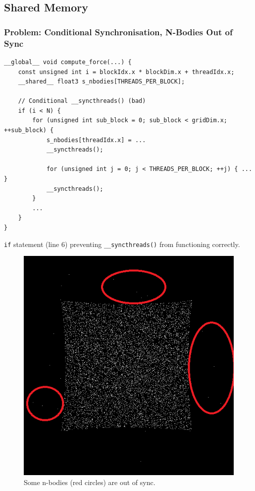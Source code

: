 \documentclass[12pt, a4paper]{article}
\begin{document}
\subsection{Shared Memory}
\subsubsection{Problem: Conditional Synchronisation, N-Bodies Out of Sync}
\begin{listing}[H]
  \begin{verbatim}
__global__ void compute_force(...) {
    const unsigned int i = blockIdx.x * blockDim.x + threadIdx.x;
    __shared__ float3 s_nbodies[THREADS_PER_BLOCK];

    // Conditional __syncthreads() (bad)
    if (i < N) {
        for (unsigned int sub_block = 0; sub_block < gridDim.x; ++sub_block) {
            s_nbodies[threadIdx.x] = ...
            __syncthreads();

            for (unsigned int j = 0; j < THREADS_PER_BLOCK; ++j) { ... }
            __syncthreads();
        }
        ...
    }
}
  \end{verbatim}
  \caption{\texttt{if} statement (line 6) preventing \texttt{\_\_syncthreads()} from functioning correctly.}
  \label{listing:shared_mem_difficulty}
\end{listing}

\begin{figure}[H]
  \centering
  \includegraphics[width=\textwidth]{images/shared_mem_difficulty.png}
  \caption{Some n-bodies (red circles) are out of sync.}
  \label{figure:shared_mem_difficulty}
\end{figure}
\end{document}
